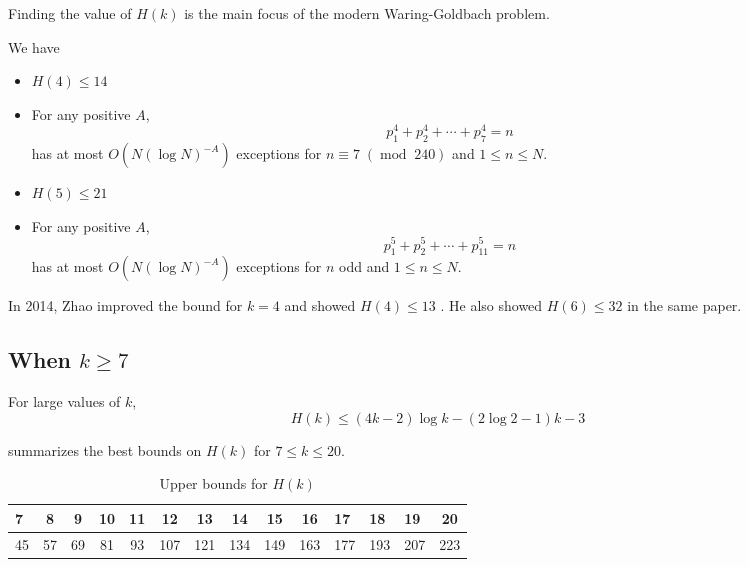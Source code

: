 Finding the value of $H(k)$ is the main focus of the modern Waring-Goldbach problem.

\begin{theorem} We have
    \begin{itemize}
        \item $H(4)\le14$
        \item For any positive $A$,
        $$p_1^4+p_2^4+\cdots+p_7^4=n$$
        has at most $O(N(\log N)^{-A})$ exceptions for $n\equiv 7\;(\operatorname{mod}\; 240)$ and $1\le n\le N$.
        \item $H(5)\le21$
        \item For any positive $A$,
        $$p_1^5+p_2^5+\cdots+p_{11}^5=n$$
        has at most $O(N(\log N)^{-A})$ exceptions for $n$ odd and $1\le n\le N$.
    \end{itemize}
\end{theorem}

 In 2014, Zhao improved the bound for $k=4$ and showed $H(4)\le 13$ \cite{Zhao_WaringGoldbach6}. He also showed $H(6)\le 32$ in the same paper.

\subsection{When $k\ge7$}

\begin{theorem} For large values of $k$,
\begin{equation}
    H(k)\le(4k-2)\log k-(2\log  2-1)k-3
\end{equation}

 summarizes the best bounds on $H(k)$ for $7\le k\le20$.

\begin{table}[ht]
    \centering
    \begin{tabular}{|l|c|c|c|c|c|c|c|c|c|l|l|l|c|}
        \hline
          7&8&  9&  10&  11&  12&  13&  14&  15&  16&    17&18&19&20\\
        \hline
          45&57&  69&  81&  93&  107&  121&  134&  149&  163&    177&193&207&223\\
        \hline
        \end{tabular}
    \caption{Upper bounds for $H(k)$}
    \label{tab:Hkbounds}
\end{table}

\end{theorem}

